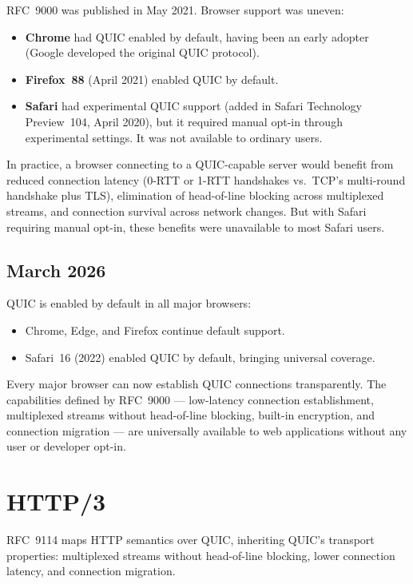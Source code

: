 \documentclass[11pt]{article}
\begin{document}
RFC~9000 was published in May 2021. Browser support was uneven:

\begin{itemize}
  \item \textbf{Chrome} had QUIC enabled by default, having been an early
    adopter (Google developed the original QUIC protocol).
  \item \textbf{Firefox~88} (April 2021) enabled QUIC by default.
  \item \textbf{Safari} had experimental QUIC support (added in Safari
    Technology Preview~104, April 2020), but it required manual opt-in
    through experimental settings. It was not available to ordinary users.
\end{itemize}

In practice, a browser connecting to a QUIC-capable server would benefit from
reduced connection latency (0-RTT or 1-RTT handshakes vs.\ TCP's multi-round
handshake plus TLS), elimination of head-of-line blocking across multiplexed
streams, and connection survival across network changes. But with Safari
requiring manual opt-in, these benefits were unavailable to most Safari users.

\subsection{March 2026}

QUIC is enabled by default in all major browsers:
\begin{itemize}
  \item Chrome, Edge, and Firefox continue default support.
  \item Safari~16 (2022) enabled QUIC by default, bringing universal coverage.
\end{itemize}

Every major browser can now establish QUIC connections transparently. The
capabilities defined by RFC~9000 --- low-latency connection establishment,
multiplexed streams without head-of-line blocking, built-in encryption, and
connection migration --- are universally available to web applications without
any user or developer opt-in.

\section{HTTP/3}

RFC~9114 maps HTTP semantics over QUIC, inheriting QUIC's transport
properties: multiplexed streams without head-of-line blocking, lower
connection latency, and connection migration.
\end{document}
